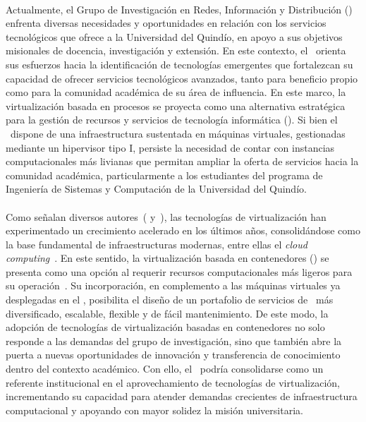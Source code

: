 \label{cap:justificacion}
\mbox{}\\
Actualmente, el Grupo de Investigación en Redes, Información y Distribución 
(\GRID) enfrenta diversas necesidades y oportunidades en relación con los servicios 
tecnológicos que ofrece a la Universidad del Quindío, en apoyo a sus objetivos 
misionales de docencia, investigación y extensión. En este contexto, el \GRID\ 
orienta sus esfuerzos hacia la identificación de tecnologías emergentes que fortalezcan 
su capacidad de ofrecer servicios tecnológicos avanzados, tanto para beneficio propio 
como para la comunidad académica de su área de influencia. En este marco, la virtualización basada en procesos se proyecta como una alternativa 
estratégica para la gestión de recursos y servicios de tecnología informática 
(\TI). Si bien el \GRID\ dispone de una infraestructura sustentada en máquinas virtuales, 
gestionadas mediante un hipervisor tipo I, persiste la necesidad de contar con instancias 
computacionales más livianas que permitan ampliar la oferta de servicios hacia la comunidad 
académica, particularmente a los estudiantes del programa de Ingeniería de Sistemas y 
Computación de la Universidad del Quindío.\\ \\
Como señalan diversos autores~(\citep{Chingo2021} y~\citep{DOGANI2023120}), las tecnologías de virtualización han experimentado un 
crecimiento acelerado en los últimos años, consolidándose como la base fundamental de 
infraestructuras modernas, entre ellas el \textit{cloud computing}~\citep{Sepulveda-Rodriguez2022}. 
En este sentido, la virtualización basada en contenedores (\VBC) se presenta como una opción 
al requerir recursos computacionales más ligeros para su operación~\citep{Xavier2013}. 
Su incorporación, en complemento a las máquinas virtuales ya desplegadas en el \GRID, 
posibilita el diseño de un portafolio de servicios de \TI\ más diversificado, escalable, 
flexible y de fácil mantenimiento. De este modo, la adopción de tecnologías de virtualización basadas en contenedores no solo 
responde a las demandas del grupo de investigación, sino que también abre la 
puerta a nuevas oportunidades de innovación y transferencia de conocimiento dentro del 
contexto académico. Con ello, el \GRID\ podría consolidarse como un referente institucional 
en el aprovechamiento de tecnologías de virtualización, incrementando su capacidad para 
atender demandas crecientes de infraestructura computacional y apoyando con mayor solidez 
la misión universitaria.